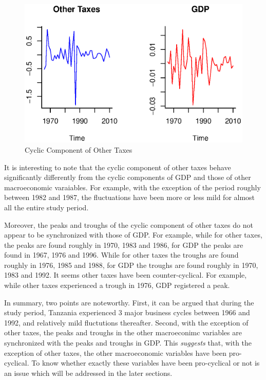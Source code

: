 \documentclass[12pt,a4paper,final]{article}
\begin{document}
\begin{figure}[ht]
\centering
\begin{small}
\caption{Cyclic Component of Other Taxes}
\end{small}
\includegraphics[scale=0.601]{other_taxes.eps} 
\end{figure}

It is interesting to note that the cyclic component of other taxes behave significantly differently from the cyclic components of GDP and those of other macroeconomic varaiables. For example, with the exception of the period roughly between 1982 and 1987, the fluctuations have been more or less mild for almost all the entire study period. 

Moreover, the peaks and troughs of the cyclic component of other taxes do not appear to be synchronized with those of GDP. For example, while for other taxes, the peaks are found roughly in 1970, 1983 and 1986, for GDP the peaks are found in 1967, 1976 and 1996. While for other taxes the troughs are found roughly in 1976, 1985 and 1988, for GDP the troughs are found roughly in 1970, 1983 and 1992.  It seems other taxes have been counter-cyclical. For example, while other taxes experienced a trough in 1976, GDP registered a peak. 

In summary, two points are noteworthy. First, it can be argued that during the study period, Tanzania experienced 3 major business cycles between 1966 and 1992, and relatively mild fluctutions thereafter. Second, with the exception of other taxes, the peaks and troughs in the other macroeconimc variables are synchronized with the peaks and troughs in GDP. This \textit{suggests} that, with the exception of other taxes, the other macroeconomic variables have been pro-cyclical.  To know whether exactly these variables have been pro-cyclical or not is an issue which will be addressed in the later sections.
\end{document}

